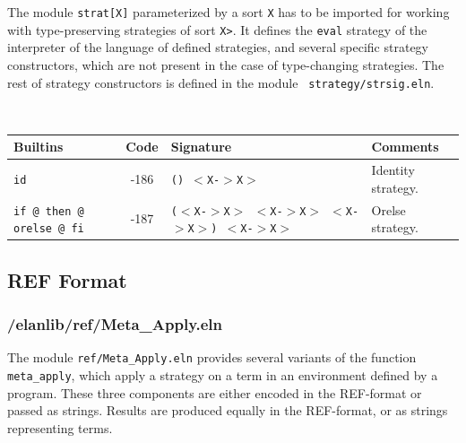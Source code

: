 
The module {\tt strat[X]} parameterized by a sort {\tt X}
has to be imported for working with type-preserving strategies
of sort {\tt <X->X>}.
It defines the {\tt eval} strategy of the interpreter of the language
of defined strategies, and several specific strategy constructors,
which are not present in the case of type-changing strategies.
The rest of strategy constructors is defined in the module {\tt
strategy/strsig.eln}.

~\\
\begin{tabular}{|p{3cm}|c|p{}|l|}
\hline
{\bf Builtins} & {\bf Code} & {\bf Signature} & {\bf Comments} \\
\hline
\hline
{\tt id}                        & -186 & {\tt () $<$X-$>$X$>$} & Identity strategy.\\
{\tt if @ then @ orelse @ fi}   & -187 & {\tt ($<$X-$>$X$>$ $<$X-$>$X$>$ $<$X-$>$X$>$) $<$X-$>$X$>$} & Orelse strategy.\\
\hline
\end{tabular}


\subsection{REF Format}

\subsubsection{/elanlib/ref/Meta\_Apply.eln}


The module {\tt ref/Meta\_Apply.eln} provides several variants of the
function {\tt meta\_apply}, which apply a strategy on a term in an
environment defined by a program.  These three components are either
encoded in the REF-format or passed as strings.  Results are produced
equally in the REF-format, or as strings representing terms.

